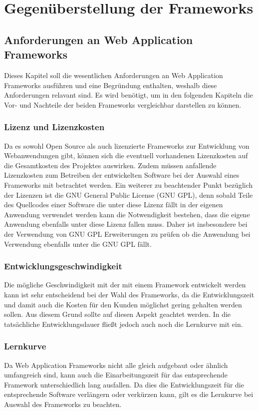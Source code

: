 \section{Gegenüberstellung der Frameworks}
\subsection{Anforderungen an Web Application Frameworks}
Dieses Kapitel soll die wesentlichen Anforderungen an Web Application Frameworks ausführen und eine Begründung enthalten, weshalb diese Anforderungen relavant sind. Es wird benötigt, um in den folgenden Kapiteln die Vor- und Nachteile der beiden Frameworks vergleichbar darstellen zu können.
\subsubsection*{Lizenz und Lizenzkosten}
Da es sowohl Open Source als auch lizenzierte Frameworks zur Entwicklung von Webanwendungen gibt, können sich die eventuell vorhandenen Lizenzkosten auf die Gesamtkosten des Projektes auswirken. Zudem müssen anfallende Lizenzkosten zum Betreiben der entwickelten Software bei der Auswahl eines Frameworks mit betrachtet werden.
Ein weiterer zu beachtender Punkt bezüglich der Lizenzen ist die GNU General Public License (GNU GPL), denn sobald Teile des Quellcodes einer Software die unter diese Lizenz fällt in der eigenen Anwendung verwendet werden kann die Notwendigkeit bestehen, dass die eigene Anwendung ebenfalls unter diese Lizenz fallen muss. Daher ist insbesondere bei der Verwendung von GNU GPL Erweiterungen zu prüfen ob die Anwendung bei Verwendung ebenfalls unter die GNU GPL fällt.
\subsubsection*{Entwicklungsgeschwindigkeit}
Die mögliche Geschwindigkeit mit der mit einem Framework entwickelt werden kann ist sehr entscheidend bei der Wahl des Frameworks, da die Entwicklungszeit und damit auch die Kosten für den Kunden möglichst gering gehalten werden sollen. Aus diesem Grund sollte auf diesen Aspekt geachtet werden. In die tatsächliche Entwicklungsdauer fließt jedoch auch noch die Lernkurve mit ein.
\subsubsection*{Lernkurve}
Da Web Application Frameworks nicht alle gleich aufgebaut oder ähnlich umfangreich sind, kann auch die Einarbeitungszeit für das entsprechende Framework unterschiedlich lang ausfallen. Da dies die Entwicklungszeit für die entsprechende Software verlängern oder verkürzen kann, gilt es die Lernkurve bei Auswahl des Frameworks zu beachten.
